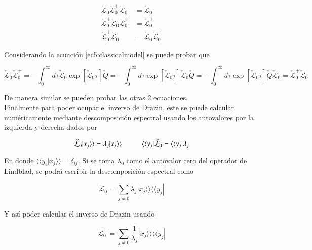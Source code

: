 \begin{appendixs}
\begin{align*}
    \check{\mathcal{L}}_{0}\check{\mathcal{L}}_{0}^{+}\check{\mathcal{L}}_{0} & = \check{\mathcal{L}}_{0} \\
    \check{\mathcal{L}}_{0}^{+}\check{\mathcal{L}}_{0}\check{\mathcal{L}}_{0}^{+} & = \check{\mathcal{L}}_{0}^{+} \\
    \check{\mathcal{L}}_{0}^{+}\check{\mathcal{L}}_{0} & = \check{\mathcal{L}}_{0}\check{\mathcal{L}}_{0}^{+}
\end{align*}

Considerando la ecuación \ref{ec5:classicalmodel} se puede probar que 

\begin{equation*}
    \check{\mathcal{L}}_{0}\check{\mathcal{L}}_{0}^{+} = - \int_{0}^{\infty}d\tau \check{\mathcal{L}}_{0}\exp[ \check{\mathcal{L}}_{0}\tau] \check{Q}= - \int_{0}^{\infty}d\tau \exp[ \check{\mathcal{L}}_{0}\tau]\check{\mathcal{L}}_{0} \check{Q} = - \int_{0}^{\infty}d\tau \exp[ \check{\mathcal{L}}_{0}\tau] \check{Q} \check{\mathcal{L}}_{0} = \check{\mathcal{L}}_{0}^{+}\check{\mathcal{L}}_{0}
\end{equation*}

De manera similar se pueden probar las otras 2 ecuaciones.\\
 Finalmente para poder ocupar el inverso de Drazin, este se puede calcular numéricamente mediante descomposición espectral usando los autovalores por la izquierda y derecha dados por 

\begin{equation*}
    \check{\mathcal{L}}_{0}|x_{j}\rangle \rangle = \lambda_{j} |x_{j}\rangle \rangle \hspace{10mm}  \langle \langle y_{j}|\check{\mathcal{L}}_{0} = \langle \langle y_{j}|\lambda_{j}
\end{equation*}

En donde $\langle \langle y_{i}|x_{j}\rangle \rangle = \delta_{ij}$. Si se toma $\lambda_{0}$ como el autovalor cero del operador de Lindblad, se podrá escribir la descomposición espectral como

\begin{equation*}
    \check{\mathcal{L}}_{0} = \sum_{j\neq 0}\lambda_{j}|x_{j}\rangle \rangle \langle \langle y_{j}|
\end{equation*}

Y así poder calcular el inverso de Drazin usando

\begin{equation*}
    \check{\mathcal{L}}^{+}_{0} = \sum_{j\neq 0}\frac{1}{\lambda_{j}}|x_{j}\rangle \rangle \langle \langle y_{j}|
\end{equation*}


\end{appendixs}

